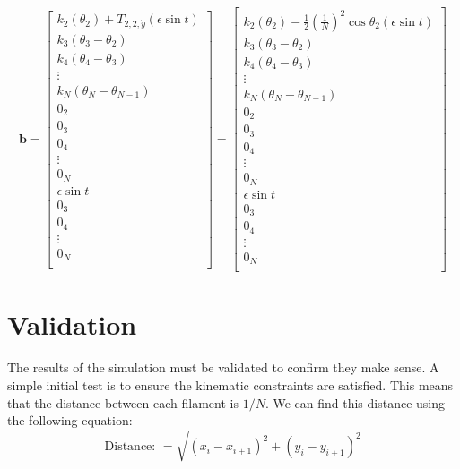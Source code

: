 \documentclass[12pt,letterpaper,titlepage]{article}
\begin{document}
\[
\mathbf{b} = \begin{bmatrix}
k_2 (\theta_2) + T_{2,2,\dot{y}}(\epsilon \sin t)\\
k_3 (\theta_3 - \theta_2)\\
k_4 (\theta_4 - \theta_3)\\
\vdots \\
k_N (\theta_N - \theta_{N-1})\\
0_2 \\
0_3 \\
0_4 \\
\vdots \\
0_N \\
\epsilon \sin t \\
0_3 \\
0_4 \\
\vdots \\
0_N \\
\end{bmatrix} = 
\begin{bmatrix}
k_2 (\theta_2) - \frac{1}{2}(\frac{1}{N})^2 \cos \theta_2 (\epsilon \sin t)\\
k_3 (\theta_3 - \theta_2)\\
k_4 (\theta_4 - \theta_3)\\
\vdots \\
k_N (\theta_N - \theta_{N-1})\\
0_2 \\
0_3 \\
0_4 \\
\vdots \\
0_N \\
\epsilon \sin t \\
0_3 \\
0_4 \\
\vdots \\
0_N \\
\end{bmatrix}
\]

\section{Validation}
The results of the simulation must be validated to confirm they make sense. A simple initial test is to ensure the kinematic constraints are satisfied. This means that the distance between each filament is $1/N$. We can find this distance using the following equation:
\begin{equation}
\text{Distance: } = \sqrt{(x_i - x_{i+1})^2 + (y_i - y_{i+1})^2}
\end{equation}
\end{document}
